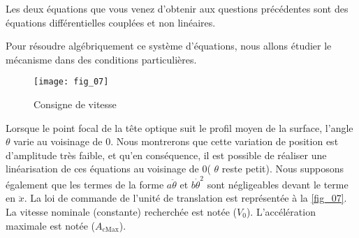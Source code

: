 \ifprof
\else

Les deux équations que vous venez d’obtenir aux questions précédentes %
sont des équations différentielles
couplées et non linéaires.




 Pour résoudre algébriquement ce système d’équations, nous allons
étudier le mécanisme dans des conditions
particulières.

\begin{figure}[H]
\centering
\texttt{[image: fig\_07]}
\caption{\label{fig_07} Consigne de vitesse}
\end{figure}

Lorsque le point focal de la tête optique suit le profil
moyen de la surface, l’angle $\theta$ varie au voisinage
de 0\degres. Nous montrerons %
que cette
variation de position est d’amplitude très faible, et
qu’en conséquence, il est possible de réaliser une linéarisation de ces équations au voisinage de 0\degres ( $\theta$ reste
petit). Nous supposons également que les termes de la forme $a\ddot{\theta}$  et $b\dot{\theta}^2$ sont négligeables devant le terme en $\ddot{x}$.
La loi de commande de l’unité de translation est représentée à la \autoref{fig_07}. La vitesse nominale (constante)
recherchée est notée ($V_0$). L’accélération maximale est notée ($A_{\text{cMax}}$).

\fi

